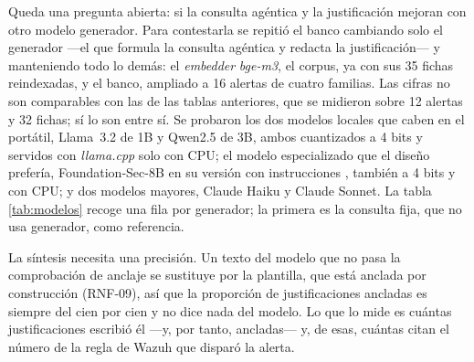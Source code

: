 Queda una pregunta abierta: si la consulta agéntica y la justificación mejoran con otro modelo
generador. Para contestarla se repitió el banco cambiando solo el generador ---el que formula la
consulta agéntica y redacta la justificación--- y manteniendo todo lo demás: el \emph{embedder}
\emph{bge-m3}, el corpus, ya con sus 35 fichas reindexadas, y el banco, ampliado a 16 alertas de
cuatro familias. Las cifras no son comparables con las de las tablas anteriores, que se midieron
sobre 12 alertas y 32 fichas; sí lo son entre sí. Se probaron los dos modelos locales que caben en
el portátil, Llama~3.2 de 1B y Qwen2.5 de 3B, ambos cuantizados a 4 bits y servidos con
\emph{llama.cpp} solo con CPU; el modelo especializado que el diseño prefería, Foundation-Sec-8B en
su versión con instrucciones \cite{foundationsec8b}, también a 4 bits y con CPU; y dos modelos
mayores, Claude Haiku y Claude Sonnet. La tabla
\ref{tab:modelos} recoge una fila por generador; la primera es la consulta fija, que no usa
generador, como referencia.

La síntesis necesita una precisión. Un texto del modelo que no pasa la comprobación de anclaje se
sustituye por la plantilla, que está anclada por construcción (RNF-09), así que la proporción de
justificaciones ancladas es siempre del cien por cien y no dice nada del modelo. Lo que lo mide es
cuántas justificaciones escribió él ---y, por tanto, ancladas--- y, de esas, cuántas citan el
número de la regla de Wazuh que disparó la alerta.


